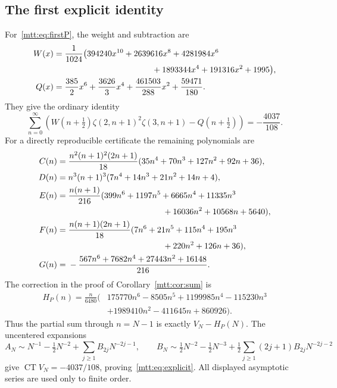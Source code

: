 \subsection{The first explicit identity}
For~\eqref{mtt:eq:firstP}, the weight and subtraction are
\begin{align}
 W(x)={}&\frac1{1024}\bigl(
 394240x^{10}+2639616x^8+4281984x^6\notag\\
 &\hspace{37mm}+1893344x^4+191316x^2+1995\bigr),
 \label{mtt:eq:explicitW}\\
 Q(x)={}&\frac{385}{2}x^6+\frac{3626}{3}x^4
                   +\frac{461503}{288}x^2+\frac{59471}{180}.
 \label{mtt:eq:explicitQ}
\end{align}
They give the ordinary identity
\begin{equation}\label{mtt:eq:explicit}
 \boxed{\displaystyle
 \sum_{n=0}^{\infty}
 \left(W(n+\tfrac12)\zeta(2,n+1)^2\zeta(3,n+1)
                    -Q(n+\tfrac12)\right)=-\frac{4037}{108}.}
\end{equation}
For a directly reproducible certificate the remaining polynomials are
\begin{align*}
 C(n)={}&\frac{n^2(n+1)^2(2n+1)}{18}
              (35n^4+70n^3+127n^2+92n+36),\\
 D(n)={}&n^3(n+1)^3(7n^4+14n^3+21n^2+14n+4),\\
 E(n)={}&\frac{n(n+1)}{216}
 (399n^6+1197n^5+6665n^4+11335n^3\\
 &\hspace{40mm}+16036n^2+10568n+5640),\\
 F(n)={}&\frac{n(n+1)(2n+1)}{18}
 (7n^6+21n^5+115n^4+195n^3\\
 &\hspace{40mm}+220n^2+126n+36),\\
 G(n)={}&-\frac{567n^6+7682n^4+27443n^2+16148}{216}.
\end{align*}
The correction in the proof of Corollary~\ref{mtt:cor:sum} is
\begin{align*}
 H_P(n)=\frac{n}{6480}\bigl(&175770n^6-8505n^5+1199985n^4-115230n^3\\
                         &+1989410n^2-411645n+860926\bigr).
\end{align*}
Thus the partial sum through $n=N-1$ is exactly $V_N-H_P(N)$.
The uncentered expansions
\[
 A_N\sim N^{-1}-\tfrac12N^{-2}
                 +\sum_{j\ge1}B_{2j}N^{-2j-1},\qquad
 B_N\sim\tfrac12N^{-2}-\tfrac12N^{-3}
                 +\tfrac12\sum_{j\ge1}(2j+1)B_{2j}N^{-2j-2}
\]
give $\operatorname{CT}V_N=-4037/108$, proving~\eqref{mtt:eq:explicit}.
All displayed asymptotic series are used only to finite order.

